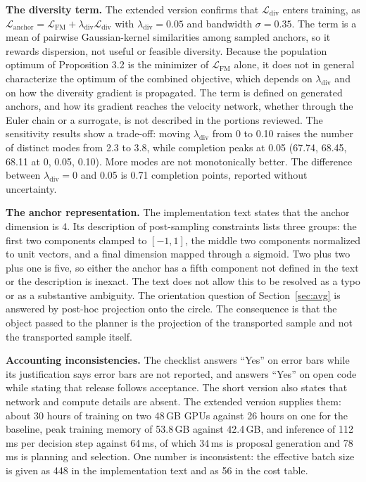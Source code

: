 \documentclass[11pt]{article}
\theoremstyle{plain}
\theoremstyle{remark}
\begin{document}
\textbf{The diversity term.} The extended version confirms that $\mathcal L_{\mathrm{div}}$ enters training, as $\mathcal L_{\mathrm{anchor}}=\mathcal L_{\mathrm{FM}}+\lambda_{\mathrm{div}}\mathcal L_{\mathrm{div}}$ with $\lambda_{\mathrm{div}}=0.05$ and bandwidth $\sigma=0.35$. The term is a mean of pairwise Gaussian-kernel similarities among sampled anchors, so it rewards dispersion, not useful or feasible diversity. Because the population optimum of Proposition 3.2 is the minimizer of $\mathcal L_{\mathrm{FM}}$ alone, it does not in general characterize the optimum of the combined objective, which depends on $\lambda_{\mathrm{div}}$ and on how the diversity gradient is propagated. The term is defined on generated anchors, and how its gradient reaches the velocity network, whether through the Euler chain or a surrogate, is not described in the portions reviewed. The sensitivity results show a trade-off: moving $\lambda_{\mathrm{div}}$ from 0 to 0.10 raises the number of distinct modes from 2.3 to 3.8, while completion peaks at 0.05 (67.74, 68.45, 68.11 at 0, 0.05, 0.10). More modes are not monotonically better. The difference between $\lambda_{\mathrm{div}}=0$ and 0.05 is 0.71 completion points, reported without uncertainty.

\textbf{The anchor representation.} The implementation text states that the anchor dimension is 4. Its description of post-sampling constraints lists three groups: the first two components clamped to $[-1,1]$, the middle two components normalized to unit vectors, and a final dimension mapped through a sigmoid. Two plus two plus one is five, so either the anchor has a fifth component not defined in the text or the description is inexact. The text does not allow this to be resolved as a typo or as a substantive ambiguity. The orientation question of Section~\ref{sec:avg} is answered by post-hoc projection onto the circle. The consequence is that the object passed to the planner is the projection of the transported sample and not the transported sample itself.

\textbf{Accounting inconsistencies.} The checklist answers ``Yes'' on error bars while its justification says error bars are not reported, and answers ``Yes'' on open code while stating that release follows acceptance. The short version also states that network and compute details are absent. The extended version supplies them: about 30 hours of training on two 48\,GB GPUs against 26 hours on one for the baseline, peak training memory of 53.8\,GB against 42.4\,GB, and inference of 112\,ms per decision step against 64\,ms, of which 34\,ms is proposal generation and 78\,ms is planning and selection. One number is inconsistent: the effective batch size is given as 448 in the implementation text and as 56 in the cost table.
\end{document}
